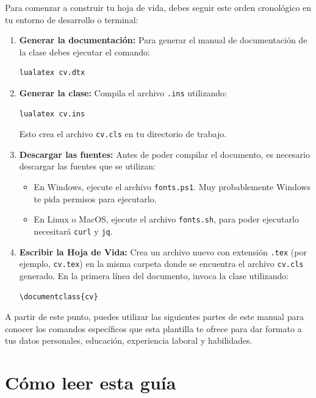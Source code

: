 Para comenzar a construir tu hoja de vida, debes seguir este orden cronológico en tu entorno de desarrollo o terminal:

\begin{enumerate}
    \item \textbf{Generar la documentación:} Para generar el manual de documentación de la clase debes ejecutar el comando:
    \begin{verbatim}
lualatex cv.dtx
    \end{verbatim}

    \item \textbf{Generar la clase:} Compila el archivo \texttt{.ins} utilizando:
    \begin{verbatim}
lualatex cv.ins
    \end{verbatim}
    Esto crea el archivo \texttt{cv.cls} en tu directorio de trabajo.

    \item \textbf{Descargar las fuentes:} Antes de poder compilar el documento, es necesario descargar las fuentes que se utilizan:
    \begin{itemize}
        \item En Windows, ejecute el archivo \texttt{fonts.ps1}. Muy probablemente Windows te pida permisos para ejecutarlo.
        \item En Linux o MacOS, ejecute el archivo \texttt{fonts.sh}, para poder ejecutarlo necesitará \texttt{curl} y \texttt{jq}.
    \end{itemize}

    \item \textbf{Escribir la Hoja de Vida:} Crea un archivo nuevo con extensión \texttt{.tex} (por ejemplo, \texttt{cv.tex}) en la misma carpeta donde se encuentra el archivo \texttt{cv.cls} generado. En la primera línea del documento, invoca la clase utilizando:
    \begin{verbatim}
\documentclass{cv}
    \end{verbatim}
\end{enumerate}

A partir de este punto, puedes utilizar las siguientes partes de este manual para conocer los comandos específicos que esta plantilla te ofrece para dar formato a tus datos personales, educación, experiencia laboral y habilidades.



\section{Cómo leer esta guía}

